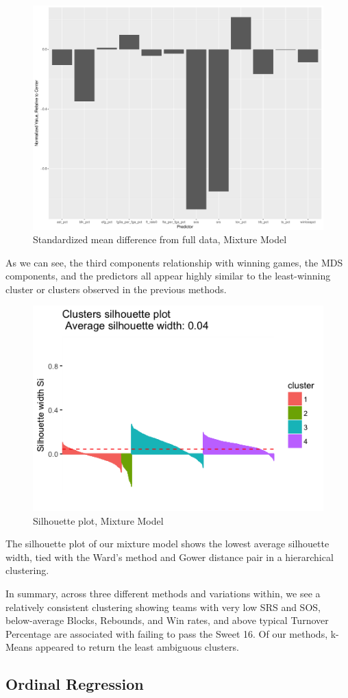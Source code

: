 \documentclass[10pt,a4paper, hidelinks]{article} %
\begin{document}
\begin{figure}[H]
	\centering
	\includegraphics[width=0.7\linewidth]{../fig/mixweak}
	\caption{Standardized mean difference from full data, Mixture Model}
\end{figure}

As we can see, the third components relationship with winning games, the MDS components, and the predictors all appear highly similar to the least-winning cluster or clusters observed in the previous methods.

\begin{figure}[H]
	\centering
	\includegraphics[width=0.5\linewidth]{"../fig/mixsil"}
	\caption{Silhouette plot, Mixture Model}
\end{figure}

The silhouette plot of our mixture model shows the lowest average silhouette width, tied with the Ward's method and Gower distance pair in a hierarchical clustering.

In summary, across three different methods and variations within, we see a relatively consistent clustering showing teams with very low SRS and SOS, below-average Blocks, Rebounds, and Win rates, and above typical Turnover Percentage are associated with failing to pass the Sweet 16.  Of our methods, k-Means appeared to return the least ambiguous clusters.

\subsection{Ordinal Regression}
\end{document}
